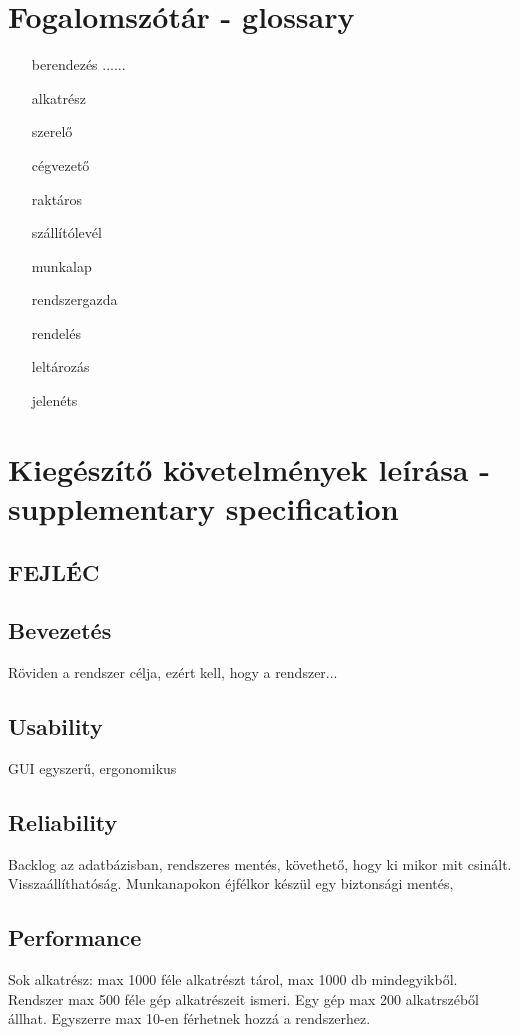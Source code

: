 \documentclass[11pt]{article}\usepackage[left=20mm,right=20mm,top=15mm,bottom=20mm]{geometry}
\begin{document}
\section{Fogalomszótár - glossary}
\begin{itemize}
\item[berendezés]......
\item[alkatrész]
\item[szerelő]
\item[cégvezető]
\item[raktáros]
\item[szállítólevél]
\item[munkalap]
\item[rendszergazda]
\item[rendelés]
\item[leltározás]
\item[jelenéts]
\end{itemize}

\section{Kiegészítő követelmények leírása - supplementary specification}
\subsection{FEJLÉC}

\subsection{Bevezetés}
Röviden a rendszer célja, ezért kell, hogy a rendszer...

\subsection{Usability}
GUI egyszerű, ergonomikus

\subsection{Reliability}
Backlog az adatbázisban, rendszeres mentés, követhető, hogy
ki mikor mit csinált. Visszaállíthatóság. 
Munkanapokon éjfélkor készül egy biztonsági mentés,

\subsection{Performance}
Sok alkatrész: max 1000 féle alkatrészt tárol, max 1000 db mindegyikből. Rendszer max 500 féle gép alkatrészeit ismeri. Egy gép max 200 alkatrszéből állhat. Egyszerre max 10-en férhetnek hozzá a rendszerhez. 
\end{document}
